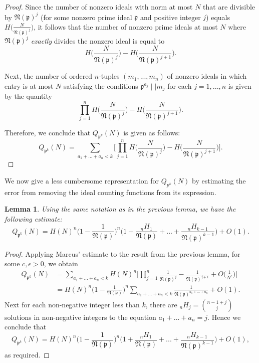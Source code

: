 \documentclass[12pt]{amsart}
\newtheorem{lemma}[theorem]{Lemma}
\theoremstyle{definition}
\newcommand{\f}[1]{\mathfrak{#1}}
\begin{document}
\begin{proof}
	Since the number of nonzero ideals with norm at most $N$ that are divisible by $\f{N}(\f{p})^j$ (for some nonzero prime ideal $\f{p}$ and positive integer $j$) equals $H\big(\frac{N}{\f{N}(\f{p})^j}\big)$, it follows that the number of nonzero prime ideals at most $N$ where $\f{N}(\f{p})^j$ \textit{exactly} divides the nonzero ideal is equal to
	$$H\bigg(\frac{N}{\f{N}(\f{p})^j}\bigg) - H\bigg(\frac{N}{\f{N}(\f{p})^{j+1}}\bigg).$$

	
	\noindent Next, the number of ordered $n$-tuples $(m_1, ..., m_n)$ of nonzero ideals in which entry is at most $N$ satisfying the conditions $\f{p}^{a_j} \mid\mid m_j$ for each $j = 1, ..., n$ is given by the quantity
	$$\prod_{j=1}^n H\bigg(\frac{N}{\f{N}(\f{p})^j}\bigg) - H\bigg(\frac{N}{\f{N}(\f{p})^{j+1}}\bigg).$$
	
	\noindent Therefore, we conclude that $Q_{\f{p}^k}(N)$ is given as follows:
	$$Q_{\f{p}^k}(N) = \sum_{a_1+...+a_n < k} \bigg[\prod_{j=1}^n H\bigg(\frac{N}{\f{N}(\f{p})^j}\bigg) - H\bigg(\frac{N}{\f{N}(\f{p})^{j+1}}\bigg)\bigg].$$ 
\end{proof}

We now give a less cumbersome representation for $Q_{p^k}(N)$ by estimating the error from removing the ideal counting functions from its expression.

\begin{lemma}
	Using the same notation as in the previous lemma, we have the following estimate:
	$$Q_{\f{p}^k}(N) = H(N)^n\Big(1 - \frac{1}{\f{N}(\f{p})}\Big)^n \Big(1 + \frac{{}_nH_1}{\f{N}(\f{p})} + ... + \frac{{}_nH_{k-1}}{\f{N}(\f{p})^{k-1}}\Big) + O(1).$$
\end{lemma}

\begin{proof}
	Applying Marcus' estimate to the result from the previous lemma, for some $c,\epsilon>0$, we obtain
	\begin{align*} 
		Q_{\f{p}^k}(N) &= \sum_{a_1+...+a_n < k} H(N)^n\Big[\prod_{j=1}^n \frac{1}{\f{N}(\f{p})^j}-\frac{1}{\f{N}(\f{p})^{j+1}}+O\bigg(\frac{1}{N^\epsilon}\bigg)\Big]\\ 
		&= H(N)^n\Big(1 - \frac{1}{\f{N}(\f{p})}\Big)^n \sum_{a_1+...+a_n < k} \frac{1}{\f{N}(\f{p})^{a_1 + ... + a_n}} + O(1). 
	\end{align*} 
	\noindent Next for each non-negative integer less than $k$, there are \small${}_nH_j = \binom{n-1+j}{j}\ $ \normalsize  solutions in non-negative integers to the equation $a_1+...+a_n = j$. Hence we conclude that
	$$Q_{\f{p}^k}(N) = H(N)^n\Big(1 - \frac{1}{\f{N}(\f{p})}\Big)^n \Big(1 + \frac{{}_nH_1}{\f{N}(\f{p})} + ... + \frac{{}_nH_{k-1}}{\f{N}(\f{p})^{k-1}}\Big) + O(1),$$
	as required.
\end{proof}
\end{document}
